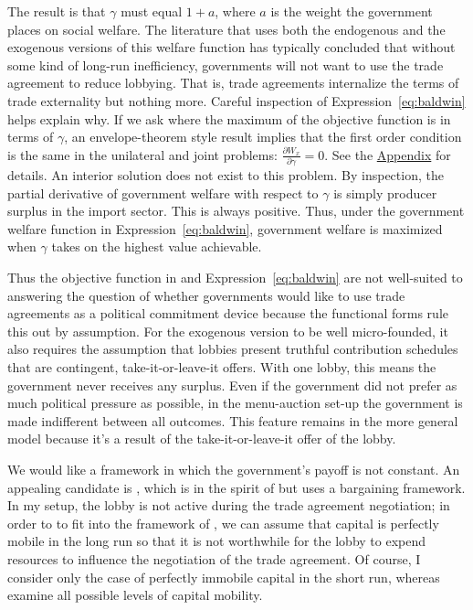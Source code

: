 \documentclass[12pt]{article}
\newcommand{\ga}{\gamma}
\begin{document}
The \Textcite{gh94} result is that $\ga$ must equal $1+a$, where $a$ is the weight the government places on social welfare. The literature that uses both the endogenous and the exogenous versions of this welfare function has typically concluded that without some kind of long-run inefficiency, governments will not want to use the trade agreement to reduce lobbying. That is, trade agreements internalize the terms of trade externality but nothing more. Careful inspection of Expression~\ref{eq:baldwin} helps explain why. If we ask where the maximum of the objective function is in terms of $\ga$, an envelope-theorem style result implies that the first order condition is the same in the unilateral and joint problems: $\displaystyle \frac{\partial W_x}{\partial \ga} = 0$. See the \hyperlink{envelope}{Appendix} for details. An interior solution does not exist to this problem. By inspection, the partial derivative of government welfare with respect to $\ga$ is simply producer surplus in the import sector. This is always positive. Thus, under the government welfare function in Expression~\ref{eq:baldwin}, government welfare is maximized when $\ga$ takes on the highest value achievable.

Thus the objective function in \Textcite{gh94} and Expression~\ref{eq:baldwin} are not well-suited to answering the question of whether governments would like to use trade agreements as a political commitment device because the functional forms rule this out by assumption. For the exogenous version to be well micro-founded, it also requires the assumption that lobbies present truthful contribution schedules that are contingent, take-it-or-leave-it offers. With one lobby, this means the government never receives any surplus. Even if the government did not prefer as much political pressure as possible, in the menu-auction set-up the government is made indifferent between all outcomes. This feature remains in the more general \Textcite{dgh97} model because it's a result of the take-it-or-leave-it offer of the lobby.

We would like a framework in which the government's payoff is not constant. An appealing candidate is \Textcite{mrc2007}, which is in the spirit of \Textcite{gh94} but uses a bargaining framework. In my setup, the lobby is not active during the trade agreement negotiation; in order to to fit into the framework of \Textcite{mrc2007}, we can assume that capital is perfectly mobile in the long run so that it is not worthwhile for the lobby to expend resources to influence the negotiation of the trade agreement. Of course, I consider only the case of perfectly immobile capital in the short run, whereas \Textcite{mrc2007} examine all possible levels of capital mobility.
\end{document}
